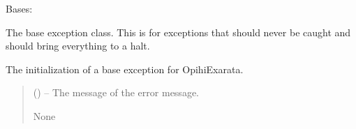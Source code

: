 \documentclass[letterpaper,11pt,english]{sphinxmanual}
\begin{document}
\begin{savenotes}\begin{fulllineitems}
\label{\detokenize{code/opihiexarata.library.error:opihiexarata.library.error.ExarataBaseException}}
\pysigstartsignatures
{}
\pysigstopsignatures
\sphinxAtStartPar
Bases: 

\sphinxAtStartPar
The base exception class. This is for exceptions that should never be
caught and should bring everything to a halt.

\begin{savenotes}\begin{fulllineitems}
\label{\detokenize{code/opihiexarata.library.error:opihiexarata.library.error.ExarataBaseException.__init__}}
\pysigstartsignatures
{}
\pysigstopsignatures
\sphinxAtStartPar
The initialization of a base exception for OpihiExarata.
\begin{quote}\begin{description}
\sphinxAtStartPar
{} () – The message of the error message.

\sphinxAtStartPar
None

\end{description}\end{quote}

\end{fulllineitems}\end{savenotes}


\end{fulllineitems}\end{savenotes}
\end{document}
